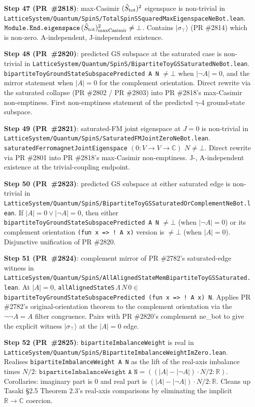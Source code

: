 \documentclass[a4paper,11pt]{article}
\begin{document}
\textbf{Step 47 (PR~\#2818)}: max-Casimir $(\hat S_{\rm tot})^2$
eigenspace is non-trivial in
\texttt{LatticeSystem/Quantum/SpinS/TotalSpinSSquaredMaxEigenspaceNeBot.lean}.
$\texttt{Module.End.eigenspace}\,(\hat S_{\rm tot})^2_{\rm
maxCasimir} \ne \bot$. Contains $|\sigma_\top\rangle$ (PR \#2814)
which is non-zero. A-independent, J-independent existence.

\textbf{Step 48 (PR~\#2820)}: predicted GS subspace at the
saturated case is non-trivial in
\texttt{LatticeSystem/Quantum/SpinS/BipartiteToyGSSaturatedNeBot.lean}.
\texttt{bipartiteToyGroundStateSubspacePredicted A N} $\ne \bot$
when $|\neg A| = 0$, and the mirror statement when $|A| = 0$ for
the complement orientation. Direct rewrite via the saturated
collapse (PR \#2802 / PR \#2803) into PR \#2818's max-Casimir
non-emptiness. First non-emptiness statement of the predicted
$\gamma$-4 ground-state subspace.

\textbf{Step 49 (PR~\#2821)}: saturated-FM joint eigenspace at
$J = 0$ is non-trivial in
\texttt{LatticeSystem/Quantum/SpinS/SaturatedFMJointZeroNeBot.lean}.
\texttt{saturatedFerromagnetJointEigenspace} $(0 : V \to V \to
\mathbb C)$ $N \ne \bot$. Direct rewrite via PR \#2801 into PR
\#2818's max-Casimir non-emptiness. J-, A-independent existence at
the trivial-coupling endpoint.

\textbf{Step 50 (PR~\#2823)}: predicted GS subspace at either
saturated edge is non-trivial in
\texttt{LatticeSystem/Quantum/SpinS/BipartiteToyGSSaturatedOrComplementNeBot.lean}.
If $|A| = 0 \lor |\neg A| = 0$, then either
\texttt{bipartiteToyGroundStateSubspacePredicted A N} $\ne \bot$
(when $|\neg A| = 0$) or its complement orientation
\texttt{(fun x => ! A x)} version is $\ne \bot$ (when $|A| = 0$).
Disjunctive unification of PR \#2820.

\textbf{Step 51 (PR~\#2824)}: complement mirror of PR \#2782's
saturated-edge witness in
\texttt{LatticeSystem/Quantum/SpinS/AllAlignedStateMemBipartiteToyGSSaturated.lean}.
At $|A| = 0$,
\texttt{allAlignedStateS}\,$\Lambda$\,$N$\,$0 \in$
\texttt{bipartiteToyGroundStateSubspacePredicted (fun x => ! A x)
N}. Applies PR \#2782's original-orientation theorem to the
complement orientation via the $\neg\neg A = A$ filter
congruence. Pairs with PR \#2820's complement ne\_bot to give the
explicit witness $|\sigma_\top\rangle$ at the $|A| = 0$ edge.

\textbf{Step 52 (PR~\#2825)}: \texttt{bipartiteImbalanceWeight}
is real in
\texttt{LatticeSystem/Quantum/SpinS/BipartiteImbalanceWeightImZero.lean}.
Realises \texttt{bipartiteImbalanceWeight A N} as the lift of the
real-axis imbalance times $N/2$:
$\texttt{bipartiteImbalanceWeight A N} =
((|A| - |\neg A|) \cdot N / 2 : \mathbb R)$.
Corollaries: imaginary part is $0$ and real part is
$(|A| - |\neg A|) \cdot N / 2 : \mathbb R$. Cleans up
Tasaki §2.5 Theorem 2.3's real-axis comparisons by eliminating
the implicit $\mathbb R \to \mathbb C$ coercion.
\end{document}
